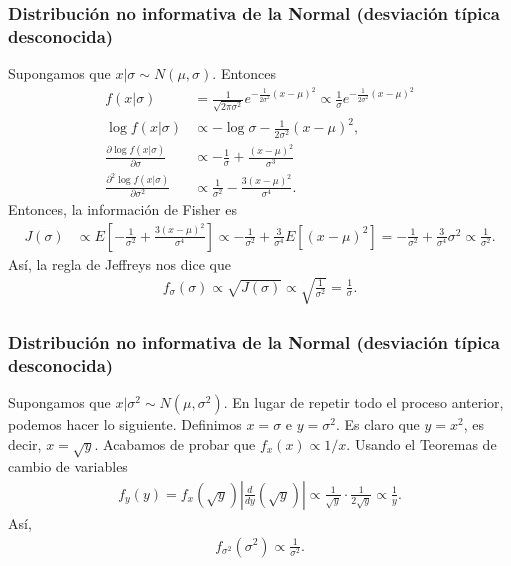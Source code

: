\subsubsection{Distribución no informativa de la Normal (desviación típica desconocida)}
Supongamos que $x | \sigma \sim N(\mu,\sigma)$. Entonces
\begin{align*}
    f(x | \sigma)                                           & = \frac{1}{\sqrt{2\pi\sigma^2}}e^{-\frac{1}{2\sigma^2}(x-\mu)^2} \propto \frac{1}{\sigma} e^{-\frac{1}{2\sigma^2}(x-\mu)^2} \\
    \log f(x | \sigma)                                      & \propto - \log \sigma - \frac{1}{2\sigma^2}(x-\mu)^2   ,                                                                    \\
    \frac{\partial \log f(x | \sigma)}{\partial \sigma}     & \propto - \frac{1}{\sigma} + \frac{(x-\mu)^2}{\sigma^3}                                                                     \\
    \frac{\partial^2 \log f(x | \sigma)}{\partial \sigma^2} & \propto \frac{1}{\sigma^2} - \frac{3(x-\mu)^2}{\sigma^4} .
\end{align*}
Entonces, la información de Fisher es
\begin{align*}
    J(\sigma) & \propto E\left[ -\frac{1}{\sigma^2} + \frac{3(x-\mu)^2}{\sigma^4} \right] \propto -\frac{1}{\sigma^2} + \frac{3}{\sigma^4} E\left[ (x-\mu)^2\right] = - \frac{1}{\sigma^2} + \frac{3}{\sigma^4}\sigma^2 \propto \frac{1}{\sigma^2}.
\end{align*}
Así, la regla de Jeffreys nos dice que
\begin{align*}
    f_{\sigma}(\sigma) \propto \sqrt{J(\sigma)} \propto \sqrt{\frac{1}{\sigma^2}} = \frac{1}{\sigma}.
\end{align*}

\subsubsection{Distribución no informativa de la Normal (desviación típica desconocida)}
Supongamos que $x | \sigma^2 \sim N(\mu,\sigma^2)$. En lugar de repetir todo el proceso anterior, podemos hacer lo siguiente. Definimos $x = \sigma$ e $y = \sigma^2$. Es claro que $y = x^2$, es decir, $x = \sqrt{y}$. Acabamos de probar que $f_{x}(x) \propto 1/x$. Usando el Teoremas de cambio de variables
\begin{align*}
    f_y(y) = f_x\left( \sqrt{y} \right) \left| \frac{d}{dy} \left( \sqrt{y} \right) \right| \propto \frac{1}{\sqrt{y}} \cdot \frac{1}{2\sqrt{y}} \propto \frac{1}{y}.
\end{align*}
Así,
\begin{align*}
    f_{\sigma^2}(\sigma^2) \propto \frac{1}{\sigma^2}.
\end{align*}

